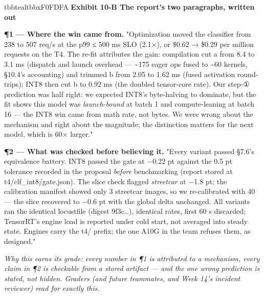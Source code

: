 \begin{calloutbox}{tbbteal}{tbbxF0FDFA}
{\normalsize\bfseries\color{tbbx115E59}Exhibit 10-B  The report's two paragraphs, written out}\par\vspace{3pt}
\textbf{¶1 — Where the win came from.} "Optimization moved the classifier from 238 to 507 req/s at the p99 ≤ 500 ms SLO (2.1×), or \$0.62 → \$0.29 per million requests on the T4. The re-fit attributes the gain: compilation cut a from 8.4 to 3.1 ms (dispatch and launch overhead — \textasciitilde{}175 eager ops fused to \textasciitilde{}60 kernels, §10.4's accounting) and trimmed b from 2.05 to 1.62 ms (fused activation round-trips); INT8 then cut b to 0.92 ms (the doubled tensor-core rate). Our step-① prediction was half right: we expected INT8's byte-halving to dominate, but the fit shows this model was \textit{launch-bound} at batch 1 and compute-leaning at batch 16 — the INT8 win came from math rate, not bytes. We were wrong about the mechanism and right about the magnitude; the distinction matters for the next model, which is 60× larger."

\textbf{¶2 — What was checked before believing it.} "Every variant passed §7.6's equivalence battery. INT8 passed the gate at −0.22 pt against the 0.5 pt tolerance recorded in the proposal \textit{before} benchmarking (report stored at t4/clf\_int8/gate.json). The slice check flagged \textit{streetcar} at −1.8 pt; the calibration manifest showed only 3 streetcar images, so we re-calibrated with 40 — the slice recovered to −0.6 pt with the global delta unchanged. All variants ran the identical locustfile (digest 9f3c…), identical rates, first 60 s discarded; TensorRT's engine load is reported under cold start, not averaged into steady state. Engines carry the t4/ prefix; the one A10G in the team refuses them, as designed."

\textit{Why this earns its grade: every number in ¶1 is attributed to a mechanism, every claim in ¶2 is checkable from a stored artifact — and the one wrong prediction is stated, not hidden. Graders (and future teammates, and Week 14's incident reviewer) read for exactly this.}
\end{calloutbox}

\vspace{3.0pt}

